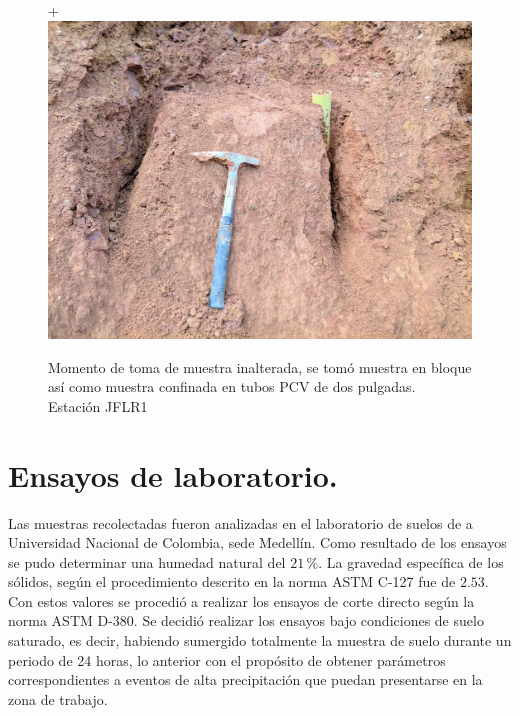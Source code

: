 \begin{figure}[H]+
\centering
\includegraphics[scale=0.20]{img/estacion11.jpg}
\caption{Momento de toma de muestra inalterada, se tom\'o muestra en bloque as\'i como muestra confinada en tubos PCV de dos pulgadas. Estaci\'on JFLR1 }
\label{fig:toma-bloque}
\end{figure}

\section{Ensayos de laboratorio.}
\label{ensayoslab}

Las muestras recolectadas fueron analizadas en el laboratorio de suelos de a Universidad Nacional de Colombia, sede Medell\'in.
Como resultado de los ensayos se pudo determinar una humedad natural del \(21\,\%\).
La gravedad espec\'ifica de los s\'olidos, seg\'un el procedimiento descrito en la norma ASTM C-127 fue de \(2.53\).
Con estos valores se procedi\'o a realizar los ensayos de corte directo seg\'un la norma ASTM D-380. Se decidi\'o realizar los ensayos bajo condiciones de suelo saturado, es decir, habiendo sumergido totalmente la muestra de suelo durante un periodo de 24 horas, lo anterior con el prop\'osito de obtener par\'ametros correspondientes a eventos de alta precipitaci\'on que puedan presentarse en la zona de trabajo.

